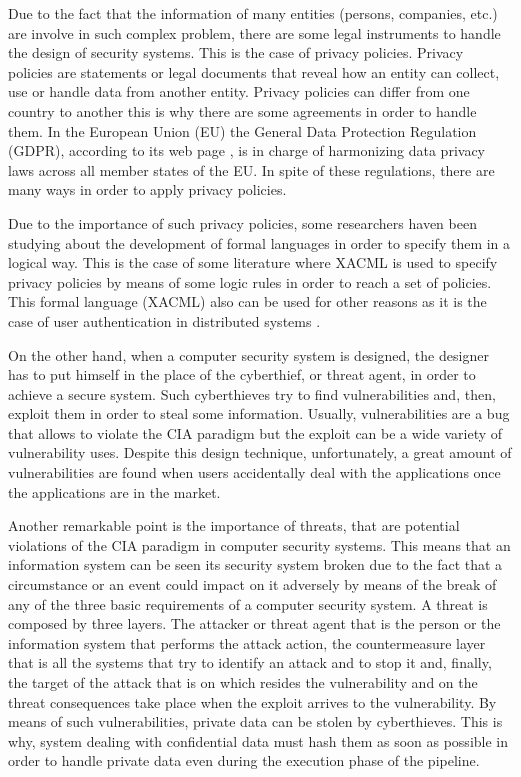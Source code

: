 {Due to the fact that the information of many entities (persons, companies, etc.) are involve in such complex problem, there are some legal instruments to handle the design of security systems. This is the case of privacy policies. Privacy policies are statements or legal documents that reveal how an entity can collect, use or handle data from another entity. Privacy policies can differ from one country to another this is why there are some agreements in order to handle them. In the European Union (EU) the General Data Protection Regulation (GDPR), according to its web page \cite{gdprwebpage}, is in charge of harmonizing data privacy laws across all member states of the EU. In spite of these regulations, there are many ways in order to apply privacy policies.

Due to the importance of such privacy policies, some researchers haven been studying about the development of formal languages in order to specify them in a logical way. This is the case of some literature \cite{XACMLlanguage} where XACML is used to specify privacy policies by means of some logic rules in order to reach a set of policies. This formal language (XACML) also can be used for other reasons as it is the case of user authentication in distributed systems \cite{XACMLforAuthentication}.

On the other hand, when a computer security system is designed, the designer has to put himself in the place of the cyberthief, or threat agent, in order to achieve a secure system. Such cyberthieves try to find vulnerabilities and, then, exploit them in order to steal some information. Usually, vulnerabilities are a bug that allows to violate the CIA paradigm but the exploit can be a wide variety of vulnerability uses. Despite this design technique, unfortunately, a great amount of vulnerabilities are found when users accidentally deal with the applications once the applications are in the market.

Another remarkable point is the importance of threats, that are potential violations of the CIA paradigm in computer security systems. This means that an information system can be seen its security system broken due to the fact that a circumstance or an event could impact on it adversely by means of the break of any of the three basic requirements of a computer security system. A threat is composed by three layers. The attacker or threat agent that is the person or the information system that performs the attack action, the countermeasure layer that is all the systems that try to identify an attack and to stop it and, finally, the target of the attack that is on which resides the vulnerability and on the threat consequences take place when the exploit arrives to the vulnerability. By means  of such vulnerabilities, private data can be stolen by cyberthieves. This is why, system dealing with confidential data must hash them as soon as possible in order to handle private data even during the execution phase of the pipeline.

}
